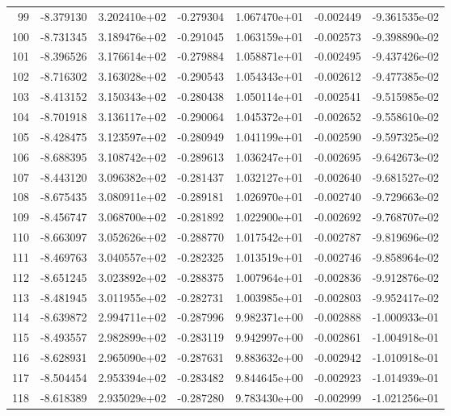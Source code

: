 \begin{tabular}{rrrrrrr}
  99 &  -8.379130 &  3.202410e+02 & -0.279304 &  1.067470e+01 &   -0.002449 & -9.361535e-02 \\
 100 &  -8.731345 &  3.189476e+02 & -0.291045 &  1.063159e+01 &   -0.002573 & -9.398890e-02 \\
 101 &  -8.396526 &  3.176614e+02 & -0.279884 &  1.058871e+01 &   -0.002495 & -9.437426e-02 \\
 102 &  -8.716302 &  3.163028e+02 & -0.290543 &  1.054343e+01 &   -0.002612 & -9.477385e-02 \\
 103 &  -8.413152 &  3.150343e+02 & -0.280438 &  1.050114e+01 &   -0.002541 & -9.515985e-02 \\
 104 &  -8.701918 &  3.136117e+02 & -0.290064 &  1.045372e+01 &   -0.002652 & -9.558610e-02 \\
 105 &  -8.428475 &  3.123597e+02 & -0.280949 &  1.041199e+01 &   -0.002590 & -9.597325e-02 \\
 106 &  -8.688395 &  3.108742e+02 & -0.289613 &  1.036247e+01 &   -0.002695 & -9.642673e-02 \\
 107 &  -8.443120 &  3.096382e+02 & -0.281437 &  1.032127e+01 &   -0.002640 & -9.681527e-02 \\
 108 &  -8.675435 &  3.080911e+02 & -0.289181 &  1.026970e+01 &   -0.002740 & -9.729663e-02 \\
 109 &  -8.456747 &  3.068700e+02 & -0.281892 &  1.022900e+01 &   -0.002692 & -9.768707e-02 \\
 110 &  -8.663097 &  3.052626e+02 & -0.288770 &  1.017542e+01 &   -0.002787 & -9.819696e-02 \\
 111 &  -8.469763 &  3.040557e+02 & -0.282325 &  1.013519e+01 &   -0.002746 & -9.858964e-02 \\
 112 &  -8.651245 &  3.023892e+02 & -0.288375 &  1.007964e+01 &   -0.002836 & -9.912876e-02 \\
 113 &  -8.481945 &  3.011955e+02 & -0.282731 &  1.003985e+01 &   -0.002803 & -9.952417e-02 \\
 114 &  -8.639872 &  2.994711e+02 & -0.287996 &  9.982371e+00 &   -0.002888 & -1.000933e-01 \\
 115 &  -8.493557 &  2.982899e+02 & -0.283119 &  9.942997e+00 &   -0.002861 & -1.004918e-01 \\
 116 &  -8.628931 &  2.965090e+02 & -0.287631 &  9.883632e+00 &   -0.002942 & -1.010918e-01 \\
 117 &  -8.504454 &  2.953394e+02 & -0.283482 &  9.844645e+00 &   -0.002923 & -1.014939e-01 \\
 118 &  -8.618389 &  2.935029e+02 & -0.287280 &  9.783430e+00 &   -0.002999 & -1.021256e-01 \\

\end{tabular}
